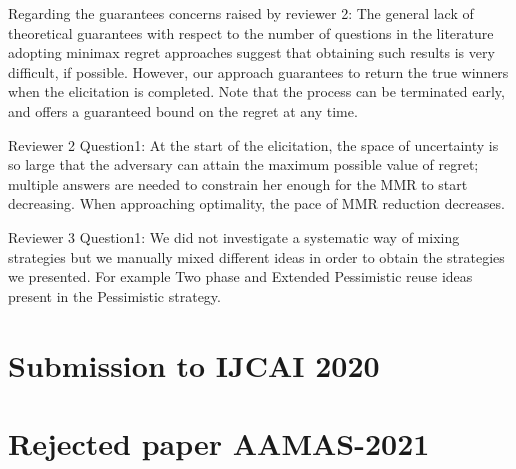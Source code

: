 \documentclass[version=3.21, pagesize, twoside=off, bibliography=totoc, DIV=calc, fontsize=12pt, a4paper]{scrartcl}
\begin{document}
Regarding the guarantees concerns raised by reviewer 2: The general lack of theoretical guarantees with respect to the number of questions in the literature adopting minimax regret approaches suggest that obtaining such results is very difficult, if possible. However, our approach guarantees to return the true winners when the elicitation is completed. Note that the process can be terminated early, and offers a guaranteed bound on the regret at any time.

Reviewer 2 Question1: At the start of the elicitation, the space of uncertainty is so large that the adversary can attain the maximum possible value of regret; multiple answers are needed to constrain her enough for the MMR to start decreasing. When approaching optimality, the pace of MMR reduction decreases.

Reviewer 3 Question1: We did not investigate a systematic way of mixing strategies but we manually mixed different ideas in order to obtain the strategies we presented. For example Two phase and Extended Pessimistic reuse ideas present in the Pessimistic strategy.

\section{Submission to IJCAI 2020}


\section{Rejected paper AAMAS-2021}
%

%
\end{document}
